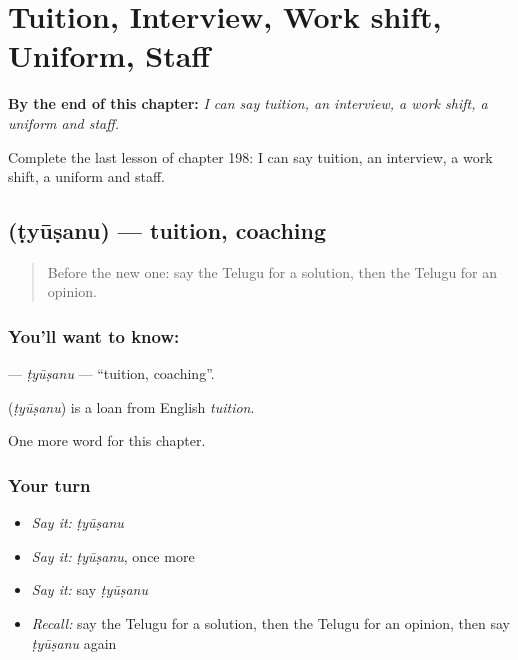 
\chapter{Tuition, Interview, Work shift, Uniform, Staff}
\label{ch:te-tuition-interview-work-shift-uniform-staff}

\begin{chapteropening}
\textbf{By the end of this chapter:} \emph{I can say tuition, an interview, a work shift, a uniform and staff.}

Complete the last lesson of chapter 198: I can say tuition, an interview, a work shift, a uniform and staff.
\end{chapteropening}

\section[\texorpdfstring{\te{ట్యూషను} (ṭyūṣanu)}{ట్యూషను (ṭyūṣanu)}]{ (ṭyūṣanu) — tuition, coaching}

\label{lesson:TE-C198-tyusanu}



\begin{quote}
Before the new one: say the Telugu for a solution, then the Telugu for an opinion.
\end{quote}

\subsection*{You'll want to know: }
\textbf{} — \emph{ṭyūṣanu} — \textquotedblleft{}tuition, coaching\textquotedblright{}.

\begin{cousinweb}
\textbf{} (\emph{ṭyūṣanu}) is a loan from English \emph{tuition}.
\end{cousinweb}

\begin{grammarlens}[title={What you've built}]
One more word for this chapter.
\end{grammarlens}

\subsection*{Your turn}
\begin{itemize}
\raggedright
  \item \emph{Say it:} \emph{ṭyūṣanu}
  \item \emph{Say it:} \emph{ṭyūṣanu}, once more
  \item \emph{Say it:} say \emph{ṭyūṣanu}
  \item \emph{Recall:} say the Telugu for a solution, then the Telugu for an opinion, then say \emph{ṭyūṣanu} again
\end{itemize}

